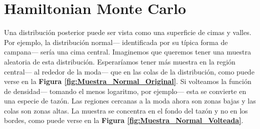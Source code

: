 \section{Hamiltonian Monte Carlo}

Una distribución posterior puede ser vista como una superficie de cimas y valles. Por ejemplo, la distribución normal--- identificada por su típica forma de campana--- sería una cima central. Imaginemos que queremos tener una muestra aleatoria de esta distribución. Esperaríamos tener más muestra en la región central--- al rededor de la moda--- que en las colas de la distribución, como puede verse en la \textbf{Figura \ref{fig:Muestra_Normal_Original}}. Si volteamos la función de densidad--- tomando el menos logaritmo, por ejemplo--- esta se convierte en una especie de tazón. Las regiones cercanas a la moda ahora son zonas bajas y las colas son zonas altas. La muestra se concentra en el fondo del tazón y no en los bordes, como puede verse en la \textbf{Figura \ref{fig:Muestra_Normal_Volteada}}.\\

